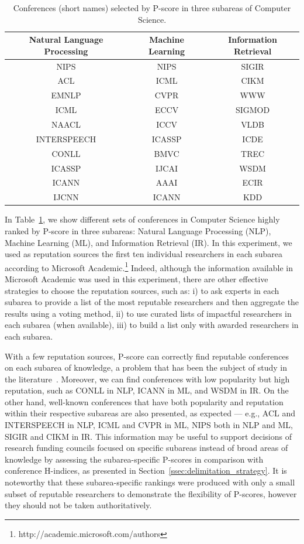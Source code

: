\documentclass[notitlepage]{svjour3}
\begin{document}
\begin{table}[ht]
  \small
  \centering
  \begin{tabular}{c c c } 
  \toprule
  Natural Language Processing  & Machine Learning & Information Retrieval  \\ 
  \midrule
  NIPS & NIPS & SIGIR \\
  ACL  & ICML & CIKM \\
  EMNLP & CVPR & WWW \\
  ICML  & ECCV & SIGMOD \\
  NAACL & ICCV & VLDB \\
  INTERSPEECH & ICASSP & ICDE \\
  CONLL  & BMVC & TREC \\
  ICASSP  & IJCAI & WSDM \\
  ICANN  & AAAI & ECIR \\
  IJCNN  & ICANN & KDD \\
  \bottomrule
  \end{tabular}
  \caption{Conferences (short names) selected by P-score in three subareas of Computer Science.}
  \label{tab:subareas}
\end{table}

In Table~\ref{tab:subareas}, we show different sets of conferences in Computer Science highly ranked by P-score in three subareas: Natural Language Processing (NLP), Machine Learning (ML), and Information Retrieval (IR). In this experiment, we used as reputation sources the first ten individual researchers in each subarea according to Microsoft Academic.\footnote{http://academic.microsoft.com/authors} %
Indeed, although the information available in Microsoft Academic was used in this experiment, there are other effective strategies to choose the reputation sources, such as: i) to ask experts in each subarea to provide a list of the most reputable researchers and then aggregate the results using a voting method, ii) to use curated lists of impactful researchers in each subarea (when available), iii) to build a list only with awarded researchers in each subarea.

With a few reputation sources, P-score can correctly find reputable conferences on each subarea of knowledge, a problem that has been the subject of study in the literature~\cite{wainer13,leydesdorff13,waltman13}. Moreover, we can find conferences with low popularity but high reputation, such as CONLL in NLP, ICANN in ML, and WSDM in IR. On the other hand, well-known conferences that have both popularity and reputation within their respective subareas are also presented, as expected --- e.g., ACL and INTERSPEECH in NLP, ICML and CVPR in ML, NIPS both in NLP and ML, SIGIR and CIKM in IR. This information may be useful to support decisions of research funding councils focused on specific subareas instead of broad areas of knowledge by assessing the subarea-specific P-scores in comparison with conference H-indices, as presented in Section~\ref{ssec:delimitation_strategy}. It is noteworthy that these subarea-specific rankings were produced with only a small subset of reputable researchers to demonstrate the flexibility of P-scores, however they should not be taken authoritatively.
\end{document}
